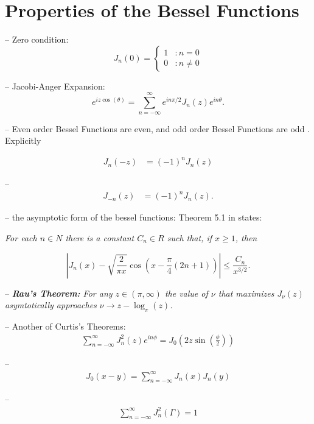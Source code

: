 \documentclass[onecolumn, groupedaddress, 10pt]{revtex4-1}
\begin{document}
\section{Properties of the Bessel Functions}
--
Zero condition:
\begin{displaymath}
\label{eqn:J_n(0)=...}
   J_n(0) = \left\{
     \begin{array}{lr}
       1 & : n = 0     \\
       0 & : n \neq 0
     \end{array}
   \right.
\end{displaymath}

--
Jacobi-Anger Expansion:
\begin{equation}
\label{eqn:jacobiAnger}
e^{iz\cos (\theta)} = \sum_{n=-\infty}^{\infty} e^{in\pi/2} J_n(z) e^{in\theta}.
\end{equation}

--
Even order Bessel Functions are even, and odd order Bessel Functions are odd \cite{kreh}.  Explicitly

\begin{align}
\label{eqn:negativeBesselProperty 1}
J_n(-z) &= (-1)^n J_n(z)
\end{align}


--
\cite{kreh}
\begin{align}
\label{eqn:negativeBesselProperty 2}
J_{-n} (z) &= (-1)^n J_n(z).
\end{align}

--
the asymptotic form of the bessel functions:
Theorem 5.1 in \cite{folland} states:

\textit{For each $n \in N$ there is a constant $C_n \in R$ such that, if $x \geq 1$, then}

\begin{equation}
\label{eqn:asymtoticBessel}
\left| J_n(x) - \sqrt{\frac{2}{\pi x}} \cos \left( x - \frac{\pi}{4} (2n+1) \right) \right| \leq \frac{C_n}{x^{3/2}}.
\end{equation}


--
\textit{\textbf{Rau's Theorem:} For any $z\in (\pi,\infty)$ the value of $\nu$ that maximizes $J_\nu (z)$ asymtotically approaches $\nu \to z - \log_\pi (z)$.}


--
Another of Curtis's Theorems:
\begin{align}
\sum_{n=-\infty}^{\infty} J_n^2(z) e^{i n \phi} = J_0 \left( 2z \sin \left( \frac{\phi}{2} \right) \right)
\end{align}


--
\begin{align}
\label{eqn:besselDifferenceProperty}
J_0(x-y) = \sum_{n=-\infty}^{\infty} J_n(x)J_n(y)
\end{align}

--
\begin{align}
\sum_{n=-\infty}^{\infty} J_n^2 (\Gamma) = 1
\end{align}


\end{document}

